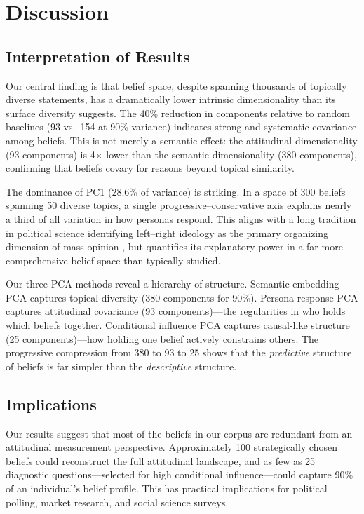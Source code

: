 \section{Discussion}
\label{sec:discussion}

\subsection{Interpretation of Results}

Our central finding is that belief space, despite spanning thousands of topically diverse statements, has a dramatically lower intrinsic dimensionality than its surface diversity suggests. The 40\% reduction in components relative to random baselines (93 vs.\ 154 at 90\% variance) indicates strong and systematic covariance among beliefs. This is not merely a semantic effect: the attitudinal dimensionality (93 components) is 4$\times$ lower than the semantic dimensionality (380 components), confirming that beliefs covary for reasons beyond topical similarity.

The dominance of PC1 (28.6\% of variance) is striking. In a space of 300 beliefs spanning 50 diverse topics, a single progressive--conservative axis explains nearly a third of all variation in how personas respond. This aligns with a long tradition in political science identifying left--right ideology as the primary organizing dimension of mass opinion \cite{converse1964nature}, but quantifies its explanatory power in a far more comprehensive belief space than typically studied.

Our three PCA methods reveal a hierarchy of structure. Semantic embedding PCA captures topical diversity (380 components for 90\%). Persona response PCA captures attitudinal covariance (93 components)---the regularities in who holds which beliefs together. Conditional influence PCA captures causal-like structure (25 components)---how holding one belief actively constrains others. The progressive compression from 380 to 93 to 25 shows that the {\em predictive} structure of beliefs is far simpler than the {\em descriptive} structure.

\subsection{Implications}

Our results suggest that most of the \nbeliefs beliefs in our corpus are redundant from an attitudinal measurement perspective. Approximately 100 strategically chosen beliefs could reconstruct the full attitudinal landscape, and as few as 25 diagnostic questions---selected for high conditional influence---could capture 90\% of an individual's belief profile. This has practical implications for political polling, market research, and social science surveys.

